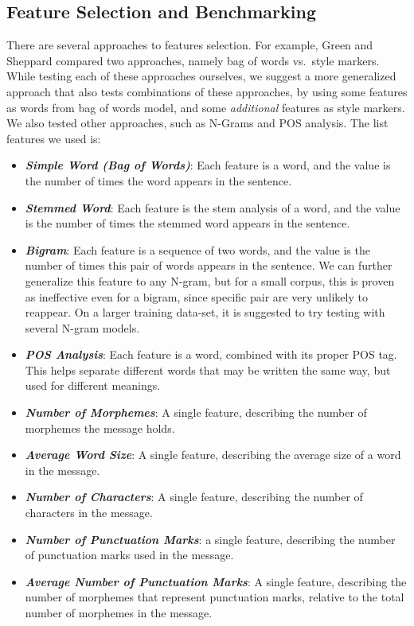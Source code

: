 \documentclass[a4paper]{article}
\begin{document}
\subsection{Feature Selection and Benchmarking}

There are several approaches to features selection. For example, Green and Sheppard\cite{rachel} compared two approaches, namely bag of words vs.\ style markers.
While testing each of these approaches ourselves, we suggest a more generalized approach that also tests combinations of these approaches, by using some features as words from bag of words model, and some \emph{additional} features as style markers.
We also tested other approaches, such as N-Grams and POS analysis. The list features we used is:
\begin{itemize}
\item \textbf{\emph{Simple Word (Bag of Words)}}: Each feature is a word, and the value is the number of times the word appears in the sentence.
\item \textbf{\emph{Stemmed Word}}: Each feature is the stem analysis of a word, and the value is the number of times the stemmed word appears in the sentence.
\item \textbf{\emph{Bigram}}: Each feature is a sequence of two words, and the value is the number of times this pair of words appears in the sentence. We can further generalize this feature to any N-gram, but for a small corpus, this is proven as ineffective even for a bigram, since specific pair are very unlikely to reappear. On a larger training data-set, it is suggested to try testing with several N-gram models.
\item \textbf{\emph{POS Analysis}}: Each feature is a word, combined with its proper POS tag. This helps separate different words that may be written the same way, but used for different meanings.
\item \textbf{\emph{Number of Morphemes}}: A single feature, describing the number of morphemes the message holds.
\item \textbf{\emph{Average Word Size}}: A single feature, describing the average size of a word in the message.
\item \textbf{\emph{Number of Characters}}: A single feature, describing the number of characters in the message.
\item \textbf{\emph{Number of Punctuation Marks}}: a single feature, describing the number of punctuation marks used in the message.
\item \textbf{\emph{Average Number of Punctuation Marks}}: A single feature, describing the number of morphemes that represent punctuation marks, relative to the total number of morphemes in the message.

\end{itemize}
\end{document}

